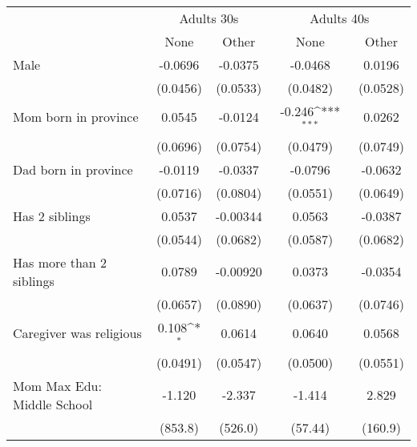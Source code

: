 {
\def\sym#1{\ifmmode^{#1}\else\(^{#1}\)\fi}
\begin{tabular}{l*{4}{c}}
\toprule
			& \multicolumn{2}{c}{Adults 30s} & \multicolumn{2}{c}{Adults 40s} \\
                    &\multicolumn{1}{c}{None}&\multicolumn{1}{c}{Other}&\multicolumn{1}{c}{None}&\multicolumn{1}{c}{Other}\\
\midrule
Male                &     -0.0696         &     -0.0375         &     -0.0468         &      0.0196         \\
                    &    (0.0456)         &    (0.0533)         &    (0.0482)         &    (0.0528)         \\
\addlinespace
Mom born in province&      0.0545         &     -0.0124         &      -0.246\sym{***}&      0.0262         \\
                    &    (0.0696)         &    (0.0754)         &    (0.0479)         &    (0.0749)         \\
\addlinespace
Dad born in province&     -0.0119         &     -0.0337         &     -0.0796         &     -0.0632         \\
                    &    (0.0716)         &    (0.0804)         &    (0.0551)         &    (0.0649)         \\
\addlinespace
Has 2 siblings      &      0.0537         &    -0.00344         &      0.0563         &     -0.0387         \\
                    &    (0.0544)         &    (0.0682)         &    (0.0587)         &    (0.0682)         \\
\addlinespace
Has more than 2 siblings&      0.0789         &    -0.00920         &      0.0373         &     -0.0354         \\
                    &    (0.0657)         &    (0.0890)         &    (0.0637)         &    (0.0746)         \\
\addlinespace
Caregiver was religious&       0.108\sym{*}  &      0.0614         &      0.0640         &      0.0568         \\
                    &    (0.0491)         &    (0.0547)         &    (0.0500)         &    (0.0551)         \\
\addlinespace
Mom Max Edu: Middle School&      -1.120         &      -2.337         &      -1.414         &       2.829         \\
                    &     (853.8)         &     (526.0)         &     (57.44)         &     (160.9)         \\

\end{tabular}}

